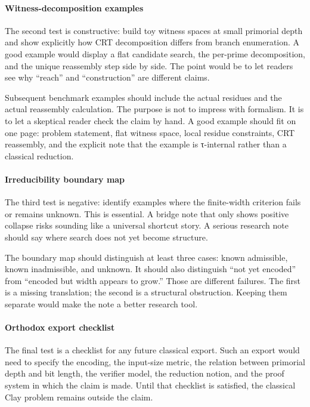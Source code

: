 \documentclass{pantarhei-researchnote}
\begin{document}
\paragraph{Witness-decomposition examples}
The second test is constructive: build toy witness spaces at small
primorial depth and show explicitly how CRT decomposition differs from
branch enumeration. A good example would display a flat candidate search,
the per-prime decomposition, and the unique reassembly step side by side.
The point would be to let readers see why ``reach'' and ``construction''
are different claims.

Subsequent benchmark examples should include the actual residues and the
actual reassembly calculation. The purpose is not to impress with
formalism. It is to let a skeptical reader check the claim by hand. A good
example should fit on one page: problem statement, flat witness space,
local residue constraints, CRT reassembly, and the explicit note that the
example is τ-internal rather than a classical reduction.

\paragraph{Irreducibility boundary map}
The third test is negative: identify examples where the finite-width
criterion fails or remains unknown. This is essential. A bridge note that
only shows positive collapse risks sounding like a universal shortcut
story. A serious research note should say where search does not yet become
structure.

The boundary map should distinguish at least three cases: known
admissible, known inadmissible, and unknown. It should also distinguish
``not yet encoded'' from ``encoded but width appears to grow.'' Those are
different failures. The first is a missing translation; the second is a
structural obstruction. Keeping them separate would make the note a
better research tool.

\paragraph{Orthodox export checklist}
The final test is a checklist for any future classical export. Such an
export would need to specify the encoding, the input-size metric, the
relation between primorial depth and bit length, the verifier model, the
reduction notion, and the proof system in which the claim is made. Until
that checklist is satisfied, the classical Clay problem remains outside
the claim.
\end{document}
